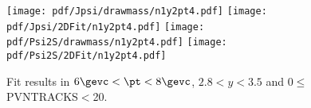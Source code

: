 \begin{figure}[H]
\begin{center}
\texttt{[image: pdf/Jpsi/drawmass/n1y2pt4.pdf]}
\texttt{[image: pdf/Jpsi/2DFit/n1y2pt4.pdf]}
\vspace*{-0.5cm}
\texttt{[image: pdf/Psi2S/drawmass/n1y2pt4.pdf]}
\texttt{[image: pdf/Psi2S/2DFit/n1y2pt4.pdf]}
\vspace*{-0.5cm}
\end{center}
\caption{Fit results in $6\gevc<\pt<8\gevc$, $2.8<y<3.5$ and 0$\leq$PVNTRACKS$<$20.}
\label{Fitn1y2pt4}
\end{figure}
